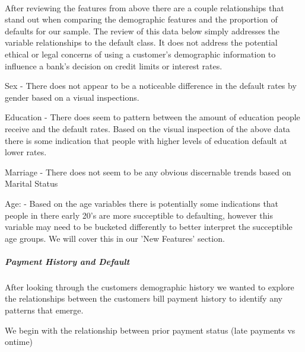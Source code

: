 \documentclass[11pt]{article}
\begin{document}
    \begin{center}
    \end{center}
    { \hspace*{\fill} \\}
    
    After reviewing the features from above there are a couple relationships
that stand out when comparing the demographic features and the
proportion of defaults for our sample. The review of this data below
simply addresses the variable relationships to the default class. It
does not address the potential ethical or legal concerns of using a
customer's demographic information to influence a bank's decision on
credit limits or interest rates.

Sex - There does not appear to be a noticeable difference in the default
rates by gender based on a visual inspections.

Education - There does seem to pattern between the amount of education
people receive and the default rates. Based on the visual inspection of
the above data there is some indication that people with higher levels
of education default at lower rates.

Marriage - There does not seem to be any obvious discernable trends
based on Marital Status

Age: - Based on the age variables there is potentially some indications
that people in there early 20's are more succeptible to defaulting,
however this variable may need to be bucketed differently to better
interpret the succeptible age groups. We will cover this in our 'New
Features' section.

    \subparagraph{\texorpdfstring{\emph{Payment History and
Default}}{Payment History and Default}}\label{payment-history-and-default}

After looking through the customers demographic history we wanted to
explore the relationships between the customers bill payment history to
identify any patterns that emerge.

We begin with the relationship between prior payment status (late
payments vs ontime)
\end{document}
